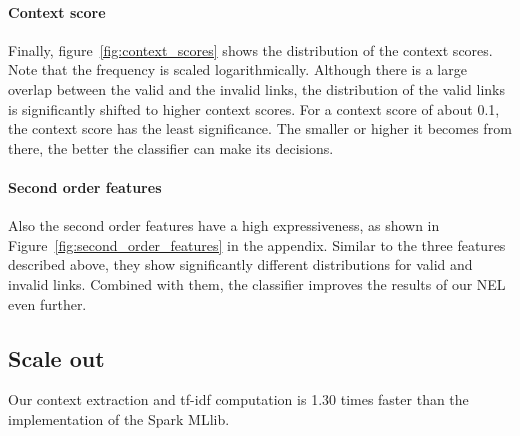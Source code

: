 \paragraph{Context score}
Finally, figure~\ref{fig:context_scores} shows the distribution of the context scores. Note that the frequency is scaled logarithmically. Although there is a large overlap between the valid and the invalid links, the distribution of the valid links is significantly shifted to higher context scores. For a context score of about 0.1, the context score has the least significance. The smaller or higher it becomes from there, the better the classifier can make its decisions.

\paragraph{Second order features}
Also the second order features have a high expressiveness, as shown in Figure~\ref{fig:second_order_features} in the appendix. Similar to the three features described above, they show significantly different distributions for valid and invalid links. Combined with them, the classifier improves the results of our NEL even further.


\subsection{Scale out}
Our context extraction and tf-idf computation is 1.30 times faster than the implementation of the Spark MLlib.\\
